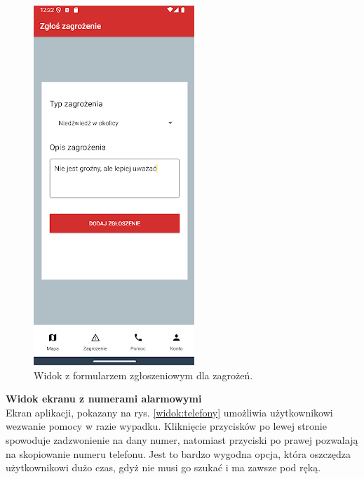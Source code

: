 \begin{figure}[H]
    \centering
    \includegraphics[scale=0.70]{img/imp/widok-danger.png}
    \caption{Widok z formularzem zgłoszeniowym dla zagrożeń.}
    \label{widok:zgłoszenie}
\end{figure}


\textbf{Widok ekranu z numerami alarmowymi} \\
Ekran aplikacji, pokazany na rys. \ref{widok:telefony} umożliwia użytkownikowi wezwanie pomocy w razie wypadku. Kliknięcie przycisków po lewej stronie spowoduje zadzwonienie na dany numer, natomiast przyciski po prawej pozwalają na skopiowanie numeru telefonu. Jest to bardzo wygodna opcja, która oszczędza użytkownikowi dużo czas, gdyż nie musi go szukać i ma zawsze pod ręką.

